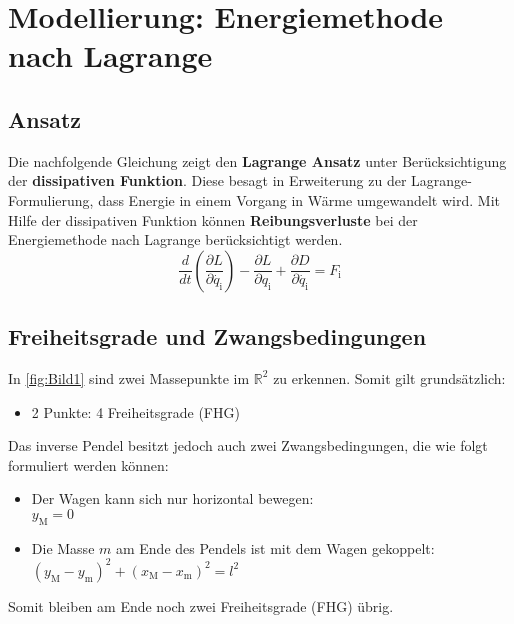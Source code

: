 \section{Modellierung: Energiemethode nach Lagrange}

\subsection{Ansatz}

Die nachfolgende Gleichung zeigt den \textbf{Lagrange Ansatz} unter Berücksichtigung der \textbf{dissipativen Funktion}. Diese besagt in Erweiterung zu der Lagrange-Formulierung, dass Energie in einem Vorgang in Wärme umgewandelt wird. Mit Hilfe der dissipativen Funktion können \textbf{Reibungsverluste} bei der Energiemethode nach Lagrange berücksichtigt werden.
\begin{equation} \label{eq:Gleichung1}
    \boxed{\frac{d}{dt} \left(\frac{\partial L}{\partial \dot{q_{\mathrm{i}}}}\right) - \frac{\partial L}{\partial q_{\mathrm{i}}} + \frac{\partial D}{\partial \dot{q_{\mathrm{i}}}} = F_{\mathrm{i}}}
\end{equation}

\subsection{Freiheitsgrade und Zwangsbedingungen}

In \autoref{fig:Bild1} sind zwei Massepunkte im $\mathbb{R}^2$ zu erkennen. Somit gilt grundsätzlich:

\begin{itemize}
    \item 2 Punkte: 4 Freiheitsgrade (FHG)
\end{itemize}

Das inverse Pendel besitzt jedoch auch zwei Zwangsbedingungen, die wie folgt formuliert werden können:

\begin{itemize}
    \item Der Wagen kann sich nur horizontal bewegen: \\ $y_{\mathrm{M}} = 0$
    \item Die Masse $m$ am Ende des Pendels ist mit dem Wagen gekoppelt: \\ $(y_{\mathrm{M}} - y_{\mathrm{m}})^2 + (x_{\mathrm{M}} - x_{\mathrm{m}})^2 = l^2$
\end{itemize}

Somit bleiben am Ende noch zwei Freiheitsgrade (FHG) übrig.

